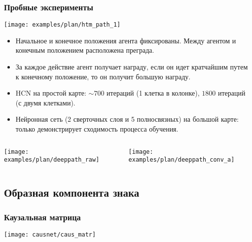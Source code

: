 \documentclass[default]{beamer}
\begin{document}
	\begin{frame}
		\frametitle{Пробные эксперименты}
		\footnotesize
		\centering
		\texttt{[image: examples/plan/htm\_path\_1]}
		
		\begin{itemize}
			\item Начальное и конечное положения агента фиксированы. Между агентом и конечным положением расположена преграда.
			\item За каждое действие агент получает награду, если он идет кратчайшим путем к конечному положение, то он получит большую награду. 
			\item HCN на простой карте: $\sim 700$ итераций (1 клетка в колонке), $1800$ итераций (с двумя клетками).
			\item Нейронная сеть (2 сверточных слоя и 5 полносвязных) на большой карте: только демонстрирует сходимость процесса обучения. 
		\end{itemize}
		\vspace{-5pt}
		\begin{columns}
			\begin{column}{0.5\textwidth}
				\centering
				\texttt{[image: examples/plan/deeppath\_raw]}
			\end{column}
			\begin{column}{0.5\textwidth}
				\centering
				\texttt{[image: examples/plan/deeppath\_conv\_a]}
			\end{column}
		\end{columns}
		
		

	\end{frame}	
	
	\subsection{Образная компонента знака}
	\begin{frame}
		\frametitle{Каузальная матрица}                             
		\centering
		\texttt{[image: causnet/caus\_matr]}
		\vspace{10pt}
		\nocite{*}
		\printbibliography[keyword={per}, resetnumbers=true]
	\end{frame}
\end{document}
